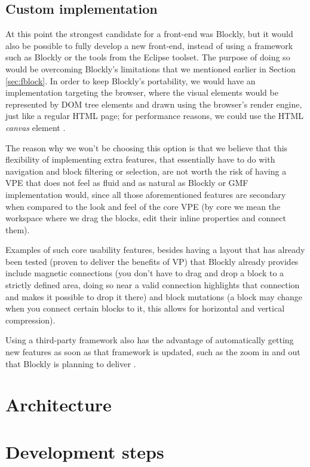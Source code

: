 \subsection{Custom implementation}

At this point the strongest candidate for a front-end was Blockly,
but it would also be possible to fully develop a new front-end, instead of using
a framework such as Blockly or the tools from the Eclipse toolset. The purpose of
doing so would be overcoming Blockly's limitations that we mentioned earlier in
Section \ref{sec:fblock}. In order to keep Blockly's portability, we would have an
implementation targeting the browser, where the visual elements would be
represented by DOM tree elements and drawn using the browser's render engine,
just like a regular HTML page; for performance reasons, we could use the HTML
\textit{canvas} element \cite{w3ccanvas}.

The reason why we won't be choosing this option is that we believe that this
flexibility of implementing extra features, that essentially have to do with
navigation and block filtering or selection, are not worth the risk of having
a VPE that does not feel as fluid and as natural as Blockly or GMF implementation would, since all
those aforementioned features are secondary when compared to the look and feel
of the core VPE (by core we mean the workspace where we drag the blocks, edit
their inline properties and connect them).

Examples of such core usability features, besides having a layout that has already been
tested (proven to deliver the benefits of VP)
that Blockly already provides include magnetic connections
(you don't have to drag and drop a block to a strictly defined area, doing so near
a valid connection highlights that connection and makes it possible to drop it there)
and block mutations (a block may change when you connect certain blocks to it,
this allows for horizontal and vertical compression).

Using a third-party framework also has the advantage of automatically getting new
features as soon as that framework is updated, such as the zoom in and out that
Blockly is planning to deliver \cite{blockly}.

\section{Architecture}

 

\section{Development steps}

